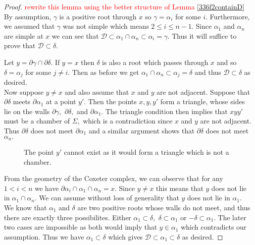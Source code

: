 \documentclass[class=book, crop=false,12 pt]{standalone}
\begin{document}
\begin{proof}
	\textcolor{red}{rewrite this lemma using the better structure of Lemma \ref{336f2containD}}\\
	By assumption, $\gamma$ is a positive root through $x$ so $\gamma=\alpha_i$ for some $i.$ Furthermore, we assumed that $\gamma$ was not simple which means $2\le i \le n-1.$ Since $\alpha_1$ and $\alpha_n$ are simple at $x$ we can see that $\mathcal{D}\subset \alpha_1\cap \alpha_n\subset \alpha_i=\gamma.$ Thus it will suffice to prove that $\mathcal{D}\subset \delta.$

	Let $y=\partial\gamma \cap \partial \delta.$ If $y=x$ then $\delta$ is also a root which passes through $x$ and so $\delta=\alpha_j$ for some $j\neq i.$ Then as before we get $\alpha_1\cap \alpha_n\subset \alpha_j=\delta$ and thus $\mathcal{D}\subset \delta$ as desired.\\

Now suppose $y\neq x$ and also assume that $x$ and $y$ are not adjacent. Suppose that $\partial \delta$ meets $\partial \alpha_1$ at a point $y'.$ Then the points $x,y,y'$ form a triangle, whose sides lie on the walls $\partial \gamma,$ $\partial \delta,$ and $\partial \alpha_1.$ The triangle condition then implies that $xyy'$ must be a chamber of $\Sigma,$ which is a contradiction since $x$ and $y$ are not adjacent. Thus $\partial \delta$ does not meet $\partial \alpha_1$ and a similar argument shows that $\partial \delta$ does not meet $\alpha_n.$ 

\begin{figure}[h]
\label{impossibletriangle}
\begin{center}
	\caption{The point $y'$ cannot exist as it would form a triangle which is not a chamber.}
\end{center}
\end{figure}


From the geometry of the Coxeter complex, we can observe that for any $1<i<n$ we have $\partial \alpha_i \cap \alpha_1\cap \alpha_n=x.$ Since $y\neq x$ this means that $y$ does not lie in $\alpha_1\cap \alpha_n.$ We can assume without loss of generality that $y$ does not lie in $\alpha_1.$ We know that $\alpha_1$ and $\delta$ are two positive roots whose walls do not meet, and thus there are exactly three possibilites. Either $\alpha_1\subset \delta,$ $\delta\subset\alpha_1$ or $-\delta\subset \alpha_1.$ The later two cases are impossible as both would imply that $y\in \alpha_1$ which contradicts our assumption. Thus we have $\alpha_1\subset\delta$ which gives $\mathcal{D}\subset\alpha_1\subset \delta$ as desired.


\end{proof}
\end{document}
